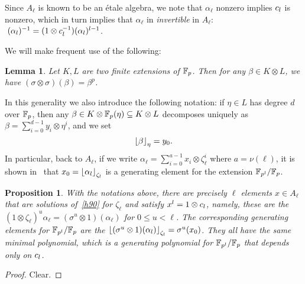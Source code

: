 \documentclass{sig-alternate}
\newtheorem{proposition}[theorem]{Proposition}
\newtheorem{lemma}[theorem]{Lemma}
\begin{document}
Since $A_\ell$ is known to be an \'etale algebra, we note
that $\alpha_\ell$ nonzero implies $c_l$ is nonzero, which in turn implies
that $\alpha_\ell$ in \emph{invertible} in $A_\ell$: $\;(\alpha_l)^{-1} = (1\otimes c_l^{-1})(\alpha_l)^{l-1}$.


We will make frequent use of the following:
\begin{lemma}
\label{FrobFrob}
Let $K,L$ are two finite extensions of $\mathbb{F}_{p}$.
Then for any $\beta\in K\otimes L$,
we have $(\sigma\otimes\sigma)(\beta)=\beta^p$.
\end{lemma}
In this generality we also introduce the following notation: if $\eta\in L$ has degree $d$ over $\mathbb{F}_{p}$,
then any $\beta\in K\otimes\mathbb{F}_{p}(\eta)\subseteq K\otimes L$ decomposes uniquely as $\beta = \sum_{i =  0}^{d-1}y_i\otimes\eta^i$,
and we set  \[ \left\lfloor \beta \right\rfloor_{\eta}=y_0. \]
In particular, back to $A_\ell$, if we write
$\alpha_\ell = \sum_{i =  0}^{a-1}x_i\otimes\zeta_{\ell}^i$ where $a=\nu(\ell)$,
it is shown in~\cite{Allombert02} that $x_0=\left\lfloor \alpha_l \right\rfloor_{\zeta_l}$ is a generating element for the extension
$\mathbb{F}_{p^l}/\mathbb{F}_{p}$.

\begin{proposition}
\label{depend}
With the notations above, there are precisely $\ell$ elements $x\in A_\ell$ that are solutions of~\eqref{h90} for $\zeta_\ell$
and satisfy $x^l=1\otimes c_l$, namely, these are the $(1\otimes\zeta_\ell)^u\alpha_\ell=(\sigma^u\otimes 1)(\alpha_\ell)$
for $0\leq u<\ell$.
The corresponding generating elements for $\mathbb{F}_{p^l}/\mathbb{F}_{p}$ are the $\left\lfloor (\sigma^u\otimes 1)(\alpha_l) \right\rfloor_{\zeta_l}=\sigma^u(x_0)$.
They all have the same minimal polynomial, which is a generating polynomial for $\mathbb{F}_{p^l}/\mathbb{F}_{p}$ that depends only on $c_l$.
\end{proposition}
\begin{proof}
Clear.
\end{proof}
\end{document}
